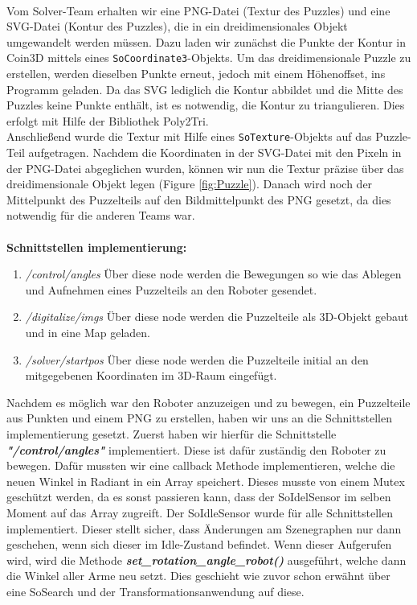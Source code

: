 \\
Vom Solver-Team erhalten wir eine PNG-Datei (Textur des Puzzles) und eine SVG-Datei (Kontur des Puzzles), die in ein dreidimensionales Objekt umgewandelt werden müssen. Dazu laden wir zunächst die Punkte der Kontur in Coin3D mittels eines \texttt{SoCoordinate3}-Objekts. Um das dreidimensionale Puzzle zu erstellen, werden dieselben Punkte erneut, jedoch mit einem Höhenoffset, ins Programm geladen. Da das SVG lediglich die Kontur abbildet und die Mitte des Puzzles keine Punkte enthält, ist es notwendig, die Kontur zu triangulieren. Dies erfolgt mit Hilfe der Bibliothek Poly2Tri.\\
Anschließend wurde die Textur mit Hilfe eines \texttt{SoTexture}-Objekts auf das Puzzle-Teil aufgetragen. Nachdem die Koordinaten in der SVG-Datei mit den Pixeln in der PNG-Datei abgeglichen wurden, können wir nun die Textur präzise über das dreidimensionale Objekt legen (Figure \ref{fig:Puzzle}). Danach wird noch der Mittelpunkt des Puzzelteils auf den Bildmittelpunkt des PNG gesetzt, da dies notwendig für die anderen Teams war.\\
\\
\textbf{Schnittstellen implementierung:}
\begin{enumerate}
    \item \textit{/control/angles} Über diese node werden die Bewegungen so wie das Ablegen und Aufnehmen eines Puzzelteils an den Roboter gesendet.
    \item \textit{/digitalize/imgs} Über diese node werden die Puzzelteile als 3D-Objekt gebaut und in eine Map geladen.
    \item \textit{/solver/startpos} Über diese node werden die Puzzelteile initial an den mitgegebenen Koordinaten im 3D-Raum eingefügt. 
\end{enumerate}
Nachdem es möglich war den Roboter anzuzeigen und zu bewegen, ein Puzzelteile aus Punkten und einem PNG zu erstellen, haben wir uns an die Schnittstellen implementierung gesetzt. Zuerst haben wir hierfür die Schnittstelle \textbf{\textit{"/control/angles"}} implementiert. Diese ist dafür zuständig den Roboter zu bewegen. Dafür mussten wir eine callback Methode implementieren, welche die neuen Winkel in Radiant in ein Array speichert. Dieses musste von einem Mutex geschützt werden, da es sonst passieren kann, dass der SoIdelSensor im selben Moment auf das Array zugreift. Der SoIdleSensor wurde für alle Schnittstellen implementiert. Dieser stellt sicher, dass Änderungen am Szenegraphen nur dann geschehen, wenn sich dieser im Idle-Zustand befindet. Wenn dieser Aufgerufen wird, wird die Methode \textbf{\textit{set\_rotation\_angle\_robot()}} ausgeführt, welche dann die Winkel aller Arme neu setzt. Dies geschieht wie zuvor schon erwähnt über eine SoSearch und der Transformationsanwendung auf diese.\\
